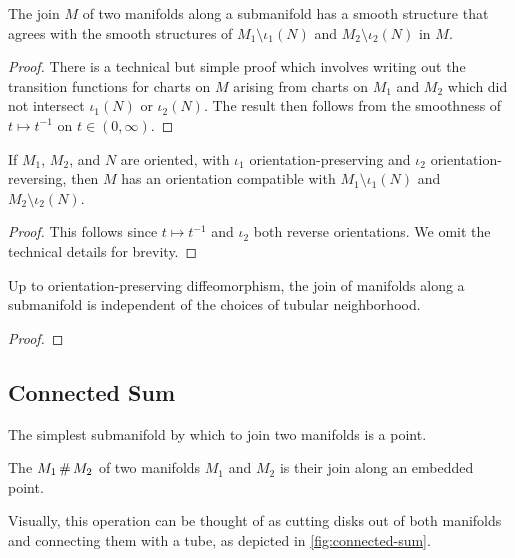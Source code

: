\begin{proposition}\label{prop:join-along-submanifolds-well-defined}
	The join $M$ of two manifolds along a submanifold has a smooth structure that agrees with the smooth structures of $M_1\setminus \iota_1(N)$ and $M_2\setminus \iota_2(N)$ in $M$. 
\end{proposition}
\begin{proof}
	There is a technical but simple proof which involves writing out the transition functions for charts on $M$ arising from charts on $M_1$ and $M_2$ which did not intersect $\iota_1(N)$ or $\iota_2(N)$. The result then follows from the smoothness of $t \mapsto t^{-1}$ on $t\in (0,\infty)$.
\end{proof}

\begin{proposition}\label{prop:join-along-submanifolds-orientation}
	If $M_1$, $M_2$, and $N$ are oriented, with $\iota_1$ orientation-preserving and $\iota_2$ orientation-reversing, then $M$ has an orientation compatible with $M_1\setminus \iota_1(N)$ and $M_2\setminus \iota_2(N)$.
\end{proposition}
\begin{proof}
	This follows since $t\mapsto t^{-1}$ and $\iota_2$ both reverse orientations. We omit the technical details for brevity.
\end{proof}

\begin{theorem}
	Up to orientation-preserving diffeomorphism, the join of manifolds along a submanifold is independent of the choices of tubular neighborhood.
\end{theorem}
\begin{proof}
\end{proof}

\subsection{Connected Sum}\label{sec:connected-sum}

The simplest submanifold by which to join two manifolds is a point.

\begin{definition}
	The  $M_1\+M_2$ of two manifolds $M_1$ and $M_2$ is their join along an embedded point.
\end{definition}

Visually, this operation can be thought of as cutting disks out of both manifolds and connecting them with a tube, as depicted in \cref{fig:connected-sum}.

